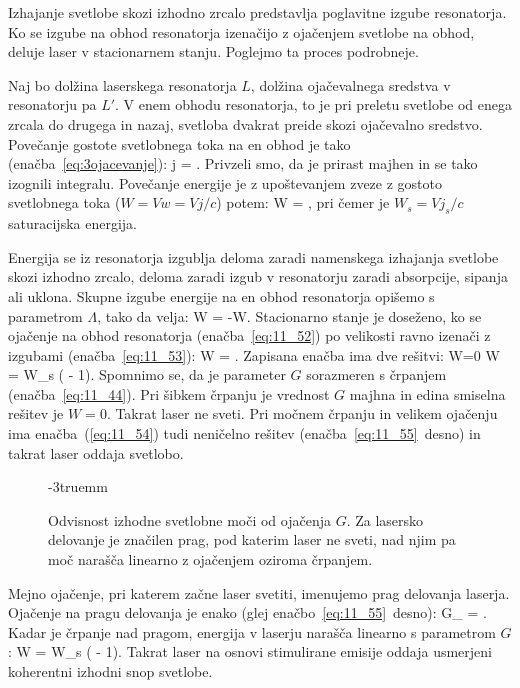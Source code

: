 Izhajanje svetlobe skozi izhodno zrcalo predstavlja poglavitne izgube 
resonatorja.  Ko se izgube na obhod resonatorja izenačijo z ojačenjem
svetlobe na obhod, deluje laser v stacionarnem stanju. Poglejmo ta proces 
podrobneje.

Naj bo dolžina laserskega resonatorja $L$, dolžina ojačevalnega sredstva 
v resonatorju pa $L'$. V enem obhodu resonatorja, to je pri preletu svetlobe
od enega zrcala do drugega in nazaj, svetloba dvakrat preide skozi ojačevalno
sredstvo. Povečanje gostote svetlobnega toka na en obhod je tako 
(enačba~\ref{eq:3ojacevanje}):
\beq
\Delta j = .
\label{eq:11_51}
\eeq
Privzeli smo, da je prirast majhen in se tako izognili integralu.
Povečanje energije je z upoštevanjem zveze z gostoto
svetlobnega toka ($W = Vw = Vj/c$) potem:
\beq
\Delta W = ,
\label{eq:11_52}
\eeq
pri čemer je $W_s = Vj_s/c$ saturacijska energija. 

Energija se iz resonatorja izgublja deloma zaradi namenskega 
izhajanja svetlobe skozi izhodno zrcalo, deloma zaradi 
izgub v resonatorju zaradi absorpcije, sipanja ali uklona. Skupne izgube
energije na en obhod resonatorja opišemo s parametrom $\Lambda$, tako da velja:
\beq
\Delta W = -\Lambda W.
\label{eq:11_53}
\eeq
Stacionarno stanje je doseženo, ko se ojačenje na obhod resonatorja 
(enačba~\ref{eq:11_52}) po velikosti ravno izenači z izgubami 
(enačba~\ref{eq:11_53}):
\beq
\Lambda W = .
\label{eq:11_54}
\eeq
Zapisana enačba ima dve rešitvi:
\beq
W=0 \qquad {} \qquad W = W_s \left( - 1\right)\!\!.
\label{eq:11_55}
\eeq
Spomnimo se, da je parameter $G$ sorazmeren s črpanjem 
(enačba~\ref{eq:11_44}). Pri šibkem črpanju je vrednost $G$ majhna in 
edina smiselna rešitev je $W=0$. Takrat laser ne sveti. Pri močnem
črpanju in velikem ojačenju ima enačba~(\ref{eq:11_54}) tudi neničelno
rešitev (enačba~\ref{eq:11_55}\, desno) in takrat laser oddaja svetlobo. 
\begin{figure}[h!]
\centering
\def\svgwidth{60truemm} 

\caption{Odvisnost izhodne svetlobne moči od ojačenja $G$. Za lasersko
delovanje je značilen prag, pod katerim laser ne sveti, nad njim pa moč
narašča linearno z ojačenjem oziroma črpanjem.
}
\label{fig:11_laserG}
\vglue-3truemm
\end{figure}

Mejno ojačenje, pri katerem začne laser svetiti, imenujemo prag 
delovanja laserja. Ojačenje na pragu delovanja je enako 
(glej enačbo~\ref{eq:11_55}\, desno):
\beq
G_ = .
\label{eq:11_56}
\eeq
Kadar je črpanje nad pragom, energija v laserju narašča linearno s 
parametrom $G$:
\beq
W = W_s \left( - 1\right)\!\!.
\label{eq:11_57}
\eeq
Takrat laser na osnovi stimulirane emisije oddaja usmerjeni 
koherentni izhodni snop svetlobe.

